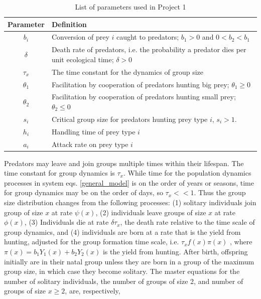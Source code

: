 \begin{table}[h]
\caption{List of parameters used in Project 1}
\begin{center}
\begin{tabular}{|c|p{5in}|}
\hline
\textbf{Parameter} & \textbf{Definition}  \\
\hline
$b_i$ & Conversion of prey $i$ caught to predators; $b_1 > 0 $ and $0 < b_2 < b_1$ \\
\hline
$\delta$ & Death rate of predators, i.e. the probability a predator dies per unit ecological time; $\delta > 0$\\
\hline
$\tau_x$ & The time constant for the dynamics of group size \\
\hline
$\theta_1$ & Facilitation by cooperation of predators hunting big prey; $\theta_1 \geq 0$ \\
\hline
$\theta_2$ & Facilitation by cooperation of predators hunting small prey; $\theta_2 \leq 0$ \\
\hline
$s_i$ & Critical group size for predators hunting prey type $i$, $s_i > 1$. \\
\hline
$h_i$ & Handling time of prey type $i$\\
\hline
$a_i$ & Attack rate on prey type $i$ \\
\hline
\end{tabular}
\end{center}
\label{originalparameters}
\end{table}%
Predators may leave and join groups multiple times within their lifespan. The time constant for group dynamics is $\tau_x$. While time for the population dynamics processes in system eqs. \ref{general_model} is on the order of years or seasons, time for group dynamics may be on the order of days, so $\tau_x << 1$. Thus the group size distribution changes from the following processes: (1) solitary individuals join group of size $x$ at rate $\psi(x)$, (2) individuals leave groups of size $x$ at rate $\phi(x)$, (3) Individuals die at rate $\delta \tau_x$, the death rate relative to the time scale of group dynamics, and (4) individuals are born at a rate that is the yield from hunting, adjusted for the group formation time scale, i.e. $\tau_x f(x) \pi(x)$ , where $\pi(x) = b_1 Y_1(x) + b_2Y_2(x)$ is the yield from hunting. After birth, offspring initially are in their natal group unless they are born in a group of the maximum group size, in which case they become solitary. The master equations for the number of solitary individuals, the number of groups of size 2, and number of groups of size $x \geq 2$, are, respectively,
